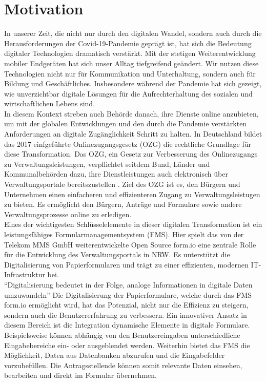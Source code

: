 \section{Motivation}
In unserer Zeit, die nicht nur durch den digitalen Wandel, sondern auch durch die Herausforderungen der Covid-19-Pandemie geprägt ist, hat sich die Bedeutung digitaler Technologien dramatisch verstärkt. Mit der stetigen Weiterentwicklung mobiler Endgeräten hat sich unser Alltag tiefgreifend geändert. Wir nutzen diese Technologien nicht nur für Kommunikation und Unterhaltung, sondern auch für Bildung und Geschäftliches. Insbesondere während der Pandemie hat sich gezeigt, wie unverzichtbar digitale Lösungen für die Aufrechterhaltung des sozialen und wirtschaftlichen Lebens sind.\\


In diesem Kontext streben auch Behörde danach, ihre Dienste online anzubieten, um mit der globalen Entwicklungen und den durch die Pandemie verstärkten Anforderungen an digitale Zugänglichkeit Schritt zu halten. In Deutschland bildet das 2017 einfgeführte Onlinezugangsgesetz (OZG) die rechtliche Grundlage für diese Transformation. Das OZG, ein Gesetz zur Verbesserung des Onlinezugangs zu Verwaltungsleistungen, verpflichtet seitdem Bund, Länder und Kommunalbehörden dazu, ihre Dienstleistungen auch elektronisch über Verwaltungsportale bereitszustellen \citep{bundesministerium_des_innern_und_fur_heimat_onlinezugangsgesetz_2017}. Ziel des OZG ist es, den Bürgern und Unternehmen einen einfacheren und effizienteren Zugang zu Verwaltungsleistugen zu bieten. Es ermöglicht den Bürgern, Anträge und Formulare sowie andere Verwaltungsprozesse online zu erledigen.\\

Eines der wichtigesten Schlüsselelemente in dieser digitalen Transformation ist ein leistungsfähiges Formularmanagementsystem (FMS). Hier spielt das von der Telekom MMS GmbH weiterentwickelte Open Source form.io \citep{formio} eine zentrale Rolle für die Entwicklung des Verwaltungsportals in NRW. Es unterstützt die Digitalisierung von Papierformularen und trägt zu einer effizienten, modernen IT-Infrastruktur bei.\\

``Digitalisierung bedeutet in der Folge, analoge Informationen in digitale Daten umzuwandeln'' \cite[S.~90]{markus_auf_2022}
Die Digitalisierung der Papierformulare, welche durch das FMS form.io ermöglicht wird, hat das Potenzial, nicht nur die Effizienz zu steigern, sondern auch die Benutzererfahrung zu verbessern. Ein innovativer Ansatz in diesem Bereich ist die Integration dynamische Elemente in digitale Formulare. Beispielsweise können abhängig von den Benutzereingaben unterschiedliche Eingabebereiche ein- oder ausgeblendet werden. Weiterhin bietet das FMS die Möglichkeit, Daten aus Datenbanken abzurufen und die Eingabefelder vorzubefüllen. Die Antragsstellende können somit relevante Daten einsehen, bearbeiten und direkt im Formular übernehmen.\\






 
